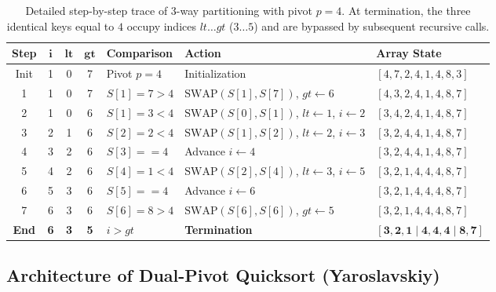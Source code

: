 \begin{table}[H]
  \centering
  \small
  \begin{tabularx}{\textwidth}{c c c c >{\centering\arraybackslash}p{2.6cm} >{\raggedright\arraybackslash}X >{\centering\arraybackslash}p{3.2cm}}
    \toprule
    \textbf{Step} & $\boldsymbol{i}$ & $\boldsymbol{lt}$ & $\boldsymbol{gt}$ & \textbf{Comparison} & \textbf{Action} & \textbf{Array State} \\
    \midrule
    Init & 1 & 0 & 7 & Pivot $p = 4$ & Initialization & $[4, 7, 2, 4, 1, 4, 8, 3]$ \\
    1 & 1 & 0 & 7 & $S[1]=7 > 4$ & $\text{SWAP}(S[1], S[7])$, $gt \leftarrow 6$ & $[4, 3, 2, 4, 1, 4, 8, 7]$ \\
    2 & 1 & 0 & 6 & $S[1]=3 < 4$ & $\text{SWAP}(S[0], S[1])$, $lt \leftarrow 1$, $i \leftarrow 2$ & $[3, 4, 2, 4, 1, 4, 8, 7]$ \\
    3 & 2 & 1 & 6 & $S[2]=2 < 4$ & $\text{SWAP}(S[1], S[2])$, $lt \leftarrow 2$, $i \leftarrow 3$ & $[3, 2, 4, 4, 1, 4, 8, 7]$ \\
    4 & 3 & 2 & 6 & $S[3] == 4$ & Advance $i \leftarrow 4$ & $[3, 2, 4, 4, 1, 4, 8, 7]$ \\
    5 & 4 & 2 & 6 & $S[4]=1 < 4$ & $\text{SWAP}(S[2], S[4])$, $lt \leftarrow 3$, $i \leftarrow 5$ & $[3, 2, 1, 4, 4, 4, 8, 7]$ \\
    6 & 5 & 3 & 6 & $S[5] == 4$ & Advance $i \leftarrow 6$ & $[3, 2, 1, 4, 4, 4, 8, 7]$ \\
    7 & 6 & 3 & 6 & $S[6]=8 > 4$ & $\text{SWAP}(S[6], S[6])$, $gt \leftarrow 5$ & $[3, 2, 1, 4, 4, 4, 8, 7]$ \\
    \midrule
    \textbf{End} & \textbf{6} & \textbf{3} & \textbf{5} & $i > gt$ & \textbf{Termination} & $\mathbf{[3, 2, 1 \mid 4, 4, 4 \mid 8, 7]}$ \\
    \bottomrule
  \end{tabularx}
  \caption{Detailed step-by-step trace of 3-way partitioning with pivot $p = 4$. At termination, the three identical keys equal to $4$ occupy indices $lt \dots gt$ ($3 \dots 5$) and are bypassed by subsequent recursive calls.}
  \label{tab:3way-execution-trace}
\end{table}

\FloatBarrier

\subsection{Architecture of Dual-Pivot Quicksort (Yaroslavskiy)}
\label{subsec:dual-pivot-architecture}


